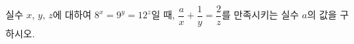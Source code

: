 실수 $x$, $y$, $z$에 대하여 $8^x=9^y=12^z$일 때, $\dfrac{a}{x}+\dfrac{1}{y}=\dfrac{2}{z}$를 만족시키는 실수 $a$의 값을 구하시오. 
